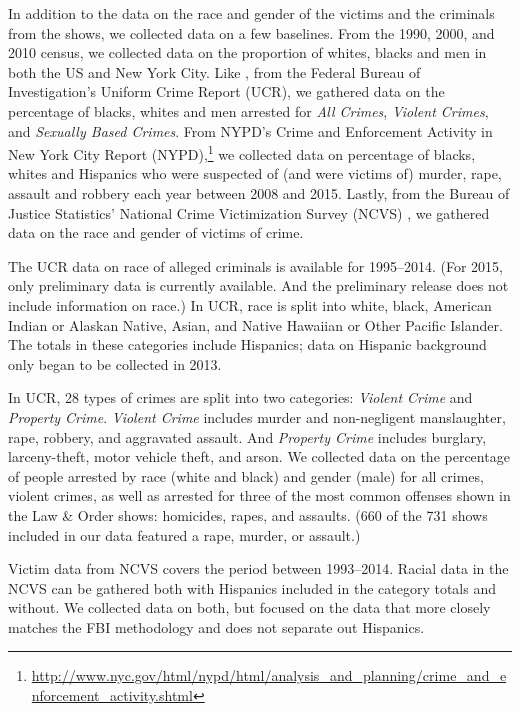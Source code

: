 \documentclass[12pt, letterpaper]{article}
\begin{document}
In addition to the data on the race and gender of the victims and the criminals from the shows, we collected data on a few baselines. From the 1990, 2000, and 2010 census, we collected data on the proportion of whites, blacks and men in both the US and New York City. Like \citet{dixon2000overrepresentation}, from the Federal Bureau of Investigation's Uniform Crime Report (UCR), we gathered data on the percentage of blacks, whites and men arrested for \textit{All Crimes}, \textit{Violent Crimes}, and \textit{Sexually Based Crimes}. From NYPD's Crime and Enforcement Activity in New York City Report (NYPD),\footnote{\url{http://www.nyc.gov/html/nypd/html/analysis_and_planning/crime_and_enforcement_activity.shtml}} we collected data on percentage of blacks, whites and Hispanics who were suspected of (and were victims of) murder, rape, assault and robbery each year between 2008 and 2015. Lastly, from the Bureau of Justice Statistics' National Crime Victimization Survey (NCVS) \citep{powers2016national, victimization1998national}, we gathered data on the race and gender of victims of crime.  

The UCR data on race of alleged criminals is available for 1995--2014. (For 2015, only preliminary data is currently available. And the preliminary release does not include information on race.) In UCR, race is split into white, black, American Indian or Alaskan Native, Asian, and Native Hawaiian or Other Pacific Islander. The totals in these categories include Hispanics; data on Hispanic background only began to be collected in 2013. 

In UCR, 28 types of crimes are split into two categories: \textit{Violent Crime} and \textit{Property Crime}. \textit{Violent Crime} includes murder and non-negligent manslaughter, rape, robbery, and aggravated assault. And \textit{Property Crime} includes burglary, larceny-theft, motor vehicle theft, and arson. We collected data on the percentage of people arrested by race (white and black) and gender (male) for all crimes, violent crimes, as well as arrested for three of the most common offenses shown in the Law \& Order shows: homicides, rapes, and assaults. (660 of the 731 shows included in our data featured a rape, murder, or assault.)

Victim data from NCVS covers the period between 1993--2014. Racial data in the NCVS can be gathered both with Hispanics included in the category totals and without. We collected data on both, but focused on the data that more closely matches the FBI methodology and does not separate out Hispanics.
\end{document}
